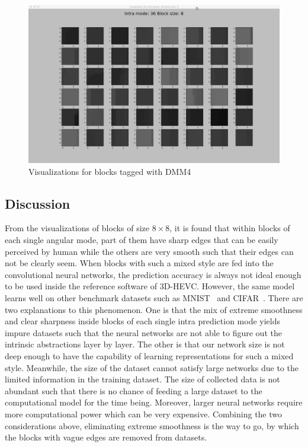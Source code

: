 \begin{figure}
        \vspace*{1cm} %
    
        \begin{minipage}{0.49\textwidth}
            \includegraphics[width=\linewidth]{Figures/visu-size8x8/8-36}
            \caption[Visualizations for blocks tagged with DMM4]{Visualizations for blocks tagged with DMM4}
            \label{fig:size8_mode36}
        \end{minipage}
    \end{figure}

\subsection{Discussion}\label{subsec:discussion-about-data-visu}
From the visualizations of blocks of size \(8\times8\),
it is found that within blocks of each single angular mode,
part of them have sharp edges that can 
be easily perceived by human while the others 
are very smooth such that their edges can not be clearly seem.
When blocks with such a mixed style are fed into the 
convolutional neural networks, the prediction accuracy
is always not ideal enough to be used
inside the reference software of 3D-HEVC\@.
However, the same model learns well on other 
benchmark datasets such as 
MNIST~\parencite{XRN001} and CIFAR~\parencite{XRN002}.
There are two explanations to this phenomenon.
One is that the mix of extreme smoothness and
clear sharpness inside blocks of each single 
intra prediction mode
yields impure datasets such that the neural networks
are not able to figure out the intrinsic abstractions
layer by layer.
The other is that our network size is not deep enough
to have the capability of learning representations 
for such a mixed style. 
Meanwhile, the size of 
the dataset cannot satisfy large networks
due to the limited information in the 
training dataset.
The size of collected data is not abundant such that
there is no chance of feeding a large dataset
to the computational model for the time being.
Moreover, larger neural networks require more 
computational power which can be very expensive.
Combining the two considerations above, 
eliminating extreme smoothness is the way to go,
by which the blocks with vague edges are removed
from datasets.

